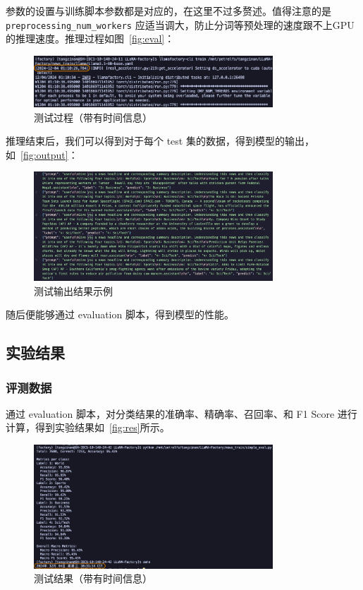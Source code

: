 参数的设置与训练脚本参数都是对应的，在这里不过多赘述。值得注意的是 \texttt{preprocessing\_num\_workers} 应适当调大，防止分词等预处理的速度跟不上GPU的推理速度。推理过程如图~\autoref{fig:eval}：\begin{figure}[htbp]
    \centering
    \includegraphics[width=0.8\textwidth]{images/inference.png}
    \caption{测试过程（带有时间信息）}
    \label{fig:eval}
\end{figure}

推理结束后，我们可以得到对于每个 test 集的数据，得到模型的输出，如~\autoref{fig:output}：\begin{figure}[htbp]
    \centering
    \includegraphics[width=0.8\textwidth]{images/infer.png}
    \caption{测试输出结果示例}
    \label{fig:output}
\end{figure}

随后便能够通过 evaluation 脚本，得到模型的性能。

\subsection{实验结果}

\subsubsection{评测数据}

通过 evaluation 脚本，对分类结果的准确率、精确率、召回率、和 F1 Score 进行计算，得到实验结果如~\autoref{fig:res}所示。\begin{figure}[htbp]
    \centering
    \includegraphics[width=0.8\textwidth]{images/eval.png}
    \caption{测试结果（带有时间信息）}
    \label{fig:res}
\end{figure}

